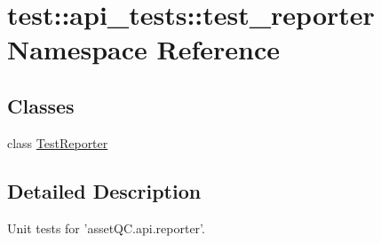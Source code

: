 \hypertarget{namespacetest_1_1api__tests_1_1test__reporter}{\section{test\-:\-:api\-\_\-tests\-:\-:test\-\_\-reporter \-Namespace \-Reference}
\label{d9/d87/namespacetest_1_1api__tests_1_1test__reporter}
}
\subsection*{\-Classes}
\begin{DoxyCompactItemize}
\item 
class \hyperlink{classtest_1_1api__tests_1_1test__reporter_1_1TestReporter}{\-Test\-Reporter}
\end{DoxyCompactItemize}


\subsection{\-Detailed \-Description}
\begin{DoxyVerb}
Unit tests for 'assetQC.api.reporter'.
\end{DoxyVerb}
 